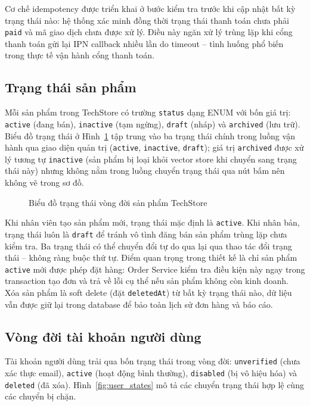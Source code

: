 Cơ chế idempotency được triển khai ở bước kiểm tra trước khi cập nhật bất kỳ trạng thái nào: hệ thống xác minh đồng thời trạng thái thanh toán chưa phải \texttt{paid} và mã giao dịch chưa được xử lý. Điều này ngăn xử lý trùng lặp khi cổng thanh toán gửi lại IPN callback nhiều lần do timeout -- tình huống phổ biến trong thực tế vận hành cổng thanh toán.

\subsection{Trạng thái sản phẩm}
\label{sec:c3_product_states}

Mỗi sản phẩm trong TechStore có trường \texttt{status} dạng ENUM với bốn giá trị: \texttt{active} (đang bán), \texttt{inactive} (tạm ngừng), \texttt{draft} (nháp) và \texttt{archived} (lưu trữ). Biểu đồ trạng thái ở Hình~\ref{fig:product_states} tập trung vào ba trạng thái chính trong luồng vận hành qua giao diện quản trị (\texttt{active}, \texttt{inactive}, \texttt{draft}); giá trị \texttt{archived} được xử lý tương tự \texttt{inactive} (sản phẩm bị loại khỏi vector store khi chuyển sang trạng thái này) nhưng không nằm trong luồng chuyển trạng thái qua nút bấm nên không vẽ trong sơ đồ.

\clearpage
\begin{figure}[H]
  \centering
  \caption{Biểu đồ trạng thái vòng đời sản phẩm TechStore}
  \label{fig:product_states}
\end{figure}

Khi nhân viên tạo sản phẩm mới, trạng thái mặc định là \texttt{active}. Khi nhân bản, trạng thái luôn là \texttt{draft} để tránh vô tình đăng bán sản phẩm trùng lặp chưa kiểm tra. Ba trạng thái có thể chuyển đổi tự do qua lại qua thao tác đổi trạng thái -- không ràng buộc thứ tự. Điểm quan trọng trong thiết kế là chỉ sản phẩm \texttt{active} mới được phép đặt hàng: Order Service kiểm tra điều kiện này ngay trong transaction tạo đơn và trả về lỗi cụ thể nếu sản phẩm không còn kinh doanh. Xóa sản phẩm là soft delete (đặt \texttt{deletedAt}) từ bất kỳ trạng thái nào, dữ liệu vẫn được giữ lại trong database để bảo toàn lịch sử đơn hàng và báo cáo.

\subsection{Vòng đời tài khoản người dùng}
\label{sec:c3_user_states}

Tài khoản người dùng trải qua bốn trạng thái trong vòng đời: \texttt{unverified} (chưa xác thực email), \texttt{active} (hoạt động bình thường), \texttt{disabled} (bị vô hiệu hóa) và \texttt{deleted} (đã xóa). Hình~\ref{fig:user_states} mô tả các chuyển trạng thái hợp lệ cùng các chuyển bị chặn.

